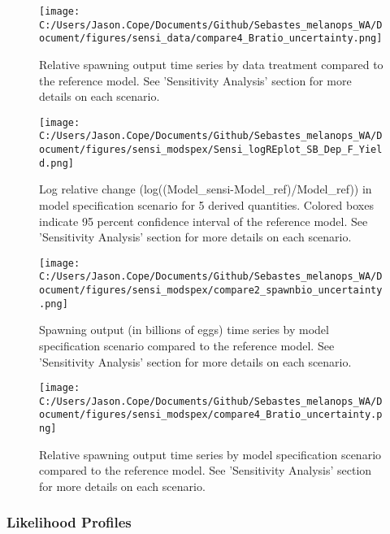 \documentclass[11pt,
  letterpaper,
]{article}
\begin{document}
\pagebreak

\begin{figure}
{\centering
\texttt{[image: C:/Users/Jason.Cope/Documents/Github/Sebastes\_melanops\_WA/Document/figures/sensi\_data/compare4\_Bratio\_uncertainty.png]}
}
\caption{Relative spawning output time series by data treatment compared to the reference model. See 'Sensitivity Analysis' section for more details on each scenario.\label{fig:sensi-data-depl}}
\end{figure}

\pagebreak

\begin{figure}
{\centering
\texttt{[image: C:/Users/Jason.Cope/Documents/Github/Sebastes\_melanops\_WA/Document/figures/sensi\_modspex/Sensi\_logREplot\_SB\_Dep\_F\_Yield.png]}
}
\caption{Log relative change (log((Model\_sensi-Model\_ref)/Model\_ref)) in model specification scenario for 5 derived quantities. Colored boxes indicate 95 percent confidence interval of the reference model. See 'Sensitivity Analysis' section for more details on each scenario.\label{fig:sensi-modspec-RE}}
\end{figure}

\pagebreak

\begin{figure}
{\centering
\texttt{[image: C:/Users/Jason.Cope/Documents/Github/Sebastes\_melanops\_WA/Document/figures/sensi\_modspex/compare2\_spawnbio\_uncertainty.png]}
}
\caption{Spawning output (in billions of eggs) time series by model specification scenario compared to the reference model. See 'Sensitivity Analysis' section for more details on each scenario.\label{fig:sensi-modspec-ssb}}
\end{figure}

\pagebreak

\begin{figure}
{\centering
\texttt{[image: C:/Users/Jason.Cope/Documents/Github/Sebastes\_melanops\_WA/Document/figures/sensi\_modspex/compare4\_Bratio\_uncertainty.png]}
}
\caption{Relative spawning output time series by model specification scenario compared to the reference model. See 'Sensitivity Analysis' section for more details on each scenario.\label{fig:sensi-modspec-depl}}
\end{figure}

\pagebreak

\hypertarget{likelihood-profiles-1}{%
\subsubsection{Likelihood Profiles}\label{likelihood-profiles-1}}
\end{document}
